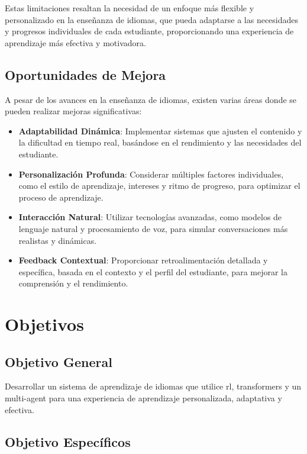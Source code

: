 Estas limitaciones resaltan la necesidad de un enfoque más flexible y personalizado en la enseñanza de idiomas, que pueda adaptarse a las necesidades y progresos individuales de cada estudiante, proporcionando una experiencia de aprendizaje más efectiva y motivadora.

\subsection{Oportunidades de Mejora}
\label{oportunidad-de-mejora}

A pesar de los avances en la enseñanza de idiomas, existen varias áreas donde se pueden realizar mejoras significativas:

\begin{itemize}
  \item \textbf{Adaptabilidad Dinámica}: Implementar sistemas que ajusten el contenido y la dificultad en tiempo real, basándose en el rendimiento y las necesidades del estudiante.
  \item \textbf{Personalización Profunda}: Considerar múltiples factores individuales, como el estilo de aprendizaje, intereses y ritmo de progreso, para optimizar el proceso de aprendizaje.
  \item \textbf{Interacción Natural}: Utilizar tecnologías avanzadas, como modelos de lenguaje natural y procesamiento de voz, para simular conversaciones más realistas y dinámicas.
  \item \textbf{Feedback Contextual}: Proporcionar retroalimentación detallada y específica, basada en el contexto y el perfil del estudiante, para mejorar la comprensión y el rendimiento.
\end{itemize}

\section{Objetivos}
\label{objetivos}

\subsection{Objetivo General}
\label{objetivo-general}

Desarrollar un sistema de aprendizaje de idiomas que utilice \gls{rl}, \gls{transformers} y un \gls{multi-agent} para una experiencia de aprendizaje personalizada, adaptativa y efectiva.

\subsection{Objetivo Específicos}
\label{objetivos-especificos}

